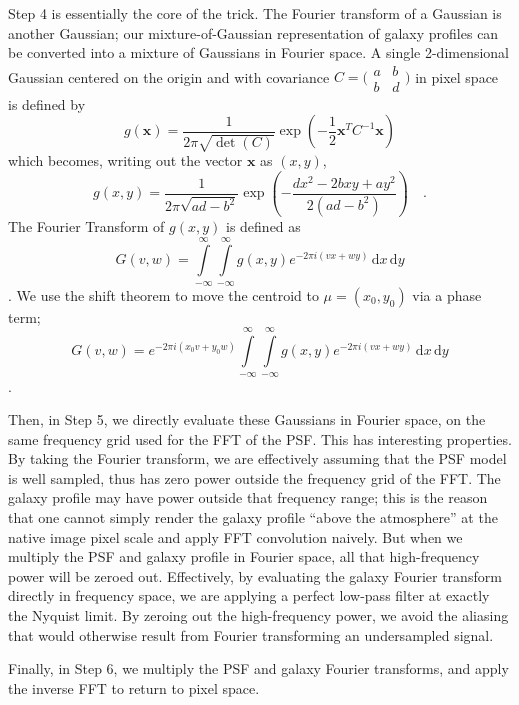 \documentclass[11pt,preprint]{aastex}
\begin{document}
Step 4 is essentially the core of the trick.  The Fourier transform of
a Gaussian is another Gaussian; our mixture-of-Gaussian representation
of galaxy profiles can be converted into a mixture of Gaussians in
Fourier space.
%
A single 2-dimensional Gaussian 
centered on the origin
and with covariance $C = \bigl(\begin{smallmatrix}
a&b \\ b&d
\end{smallmatrix} \bigr)$
in pixel space is defined by
\[ g(\bm{x}) = \frac{1}{2 \pi \sqrt{\det(C)}} 
\exp\left( -\frac{1}{2} \bm{x}^T C^{-1} \bm{x} \right)
\]
which becomes, writing out the vector $\bm{x}$ as $(x,y)$,
\[ g(x, y) = \frac{1}{2 \pi \sqrt{a d - b^2}}
\exp \left(
-\frac{d x^2 - 2 b x y + a y^2}{2(a d - b^2)}
\right) \quad .
\]
The Fourier Transform of $g(x,y)$ is defined as
\[
G(v,w) = 
\int\limits_{-\infty}^{\infty}
\int\limits_{-\infty}^{\infty}
g(x, y) e^{-2 \pi i (v x + w y)} \, \mathrm{d}x \, \mathrm{d}y
\] \quad .
We use the shift theorem to move the centroid to $\mu = (x_0, y_0)$
via a phase term;
\[
G(v, w) =
e^{-2 \pi i (x_0 v + y_0 w)}
\int\limits_{-\infty}^{\infty}
\int\limits_{-\infty}^{\infty}
g(x, y) e^{-2 \pi i (v x + w y)} \, \mathrm{d}x \, \mathrm{d}y
\] \quad .


Then, in Step 5, we directly evaluate these Gaussians in Fourier
space, on the same frequency grid used for the FFT of the PSF.  This
has interesting properties.  By taking the Fourier transform, we are
effectively assuming that the PSF model is well sampled, thus has zero
power outside the frequency grid of the FFT.  The galaxy profile may
have power outside that frequency range; this is the reason that one
cannot simply render the galaxy profile ``above the atmosphere'' at
the native image pixel scale and apply FFT convolution naively.  But
when we multiply the PSF and galaxy profile in Fourier space, all that
high-frequency power will be zeroed out.  Effectively, by evaluating
the galaxy Fourier transform directly in frequency space, we are
applying a perfect low-pass filter at exactly the Nyquist limit.  By
zeroing out the high-frequency power, we avoid the aliasing that would
otherwise result from Fourier transforming an undersampled signal.
%

Finally, in Step 6, we multiply the PSF and galaxy Fourier transforms,
and apply the inverse FFT to return to pixel space.
\end{document}
